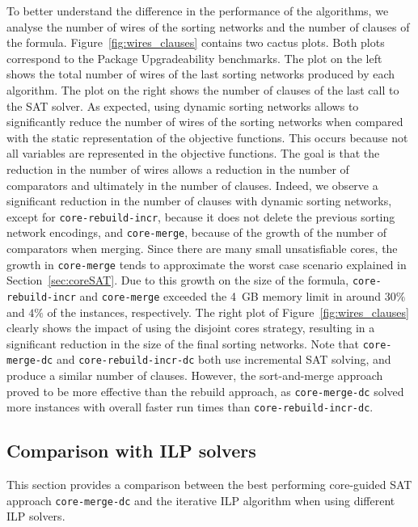 \documentclass[a4paper,UKenglish,cleveref, autoref, thm-restate]{lipics-v2021}
\begin{document}
To better understand the difference in the performance of the algorithms, we analyse the number of wires of the sorting networks and the number of clauses of the formula.
Figure~\ref{fig:wires_clauses} contains two cactus plots. Both plots correspond to the Package Upgradeability benchmarks. The plot on the left shows the total number of wires of the last sorting networks produced by each algorithm. The plot on the right shows the number of clauses of the last call to the SAT solver.
As expected, using dynamic sorting networks allows to significantly reduce the number of wires of the sorting networks when compared with the static representation of the objective functions. This occurs because not all variables are represented in the objective functions.
The goal is that the reduction in the number of wires allows a reduction in the number of comparators and ultimately in the number of clauses.
Indeed, we observe a significant reduction in the number of clauses with dynamic sorting networks, except for \texttt{core-rebuild-incr}, because it does not delete the previous sorting network encodings, and \texttt{core-merge}, because of the growth of the number of comparators when merging.
Since there are many small unsatisfiable cores, the growth in \texttt{core-merge} tends to approximate the worst case scenario explained in Section~\ref{sec:coreSAT}.
Due to this growth on the size of the formula, \texttt{core-rebuild-incr} and \texttt{core-merge} exceeded the 4~GB memory limit in around $30\%$ and $4\%$ of the instances, respectively.
The right plot of Figure~\ref{fig:wires_clauses} clearly shows the impact of using the disjoint cores strategy, resulting in a significant reduction in the size of the final sorting networks. 
Note that \texttt{core-merge-dc} and \texttt{core-rebuild-incr-dc} both use incremental SAT solving, and produce a similar number of clauses.
However, the sort-and-merge approach proved to be more effective than the rebuild approach, as \texttt{core-merge-dc} solved more instances with overall faster run times than \texttt{core-rebuild-incr-dc}.

\subsection{Comparison with ILP solvers}
\label{sec:eval-comp-ilp}
This section provides a comparison between the best performing core-guided SAT approach \texttt{core-merge-dc} and the iterative ILP algorithm when using different ILP solvers.
\end{document}
